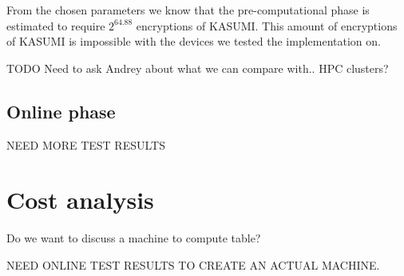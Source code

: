From the chosen parameters we know that the pre-computational phase is
estimated to require $2^{64.88}$ encryptions of KASUMI. This amount of
encryptions of KASUMI is impossible with the devices we tested the
 implementation on.

TODO Need to ask Andrey about what we can compare with.. HPC clusters?

\subsection{Online phase}

NEED MORE TEST RESULTS

\section{Cost analysis}

Do we want to discuss a machine to compute table?

NEED ONLINE TEST RESULTS TO CREATE AN ACTUAL MACHINE.
